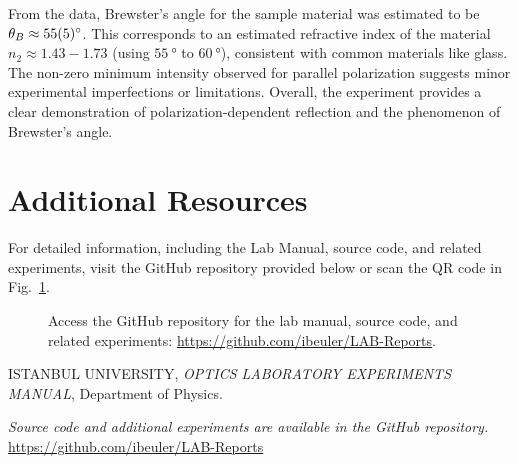 \documentclass[journal]{IEEEtran}
\begin{document}
From the data, Brewster's angle for the sample material was estimated to be $\theta_B \approx \SI{55 \pm 5}{\degree}$. This corresponds to an estimated refractive index of the material $n_2 \approx 1.43 - 1.73$ (using $\SI{55}{\degree}$ to $\SI{60}{\degree}$), consistent with common materials like glass. The non-zero minimum intensity observed for parallel polarization suggests minor experimental imperfections or limitations. Overall, the experiment provides a clear demonstration of polarization-dependent reflection and the phenomenon of Brewster's angle.

\section{Additional Resources}
For detailed information, including the Lab Manual, source code, and related experiments, visit the GitHub repository provided below or scan the QR code in Fig.~\ref{fig:qr_code}.

\begin{figure}[H]
    \centering
    \begin{minipage}{0.15\textwidth}
        \centering
    \end{minipage}%
    \begin{minipage}{0.2\textwidth}
        \raggedright
        \caption{Access the GitHub repository for the lab manual, source code, and related experiments: \href{https://github.com/ibeuler/LAB-Reports}{\url{https://github.com/ibeuler/LAB-Reports}}.}
        \label{fig:qr_code}
    \end{minipage}
\end{figure}

\begin{thebibliography}{9}
    ISTANBUL UNIVERSITY, \textit{OPTICS LABORATORY
    EXPERIMENTS MANUAL}, Department of Physics.

    \textit{Source code and additional experiments are available in the GitHub repository.} \url{https://github.com/ibeuler/LAB-Reports}
\end{thebibliography}
\end{document}
